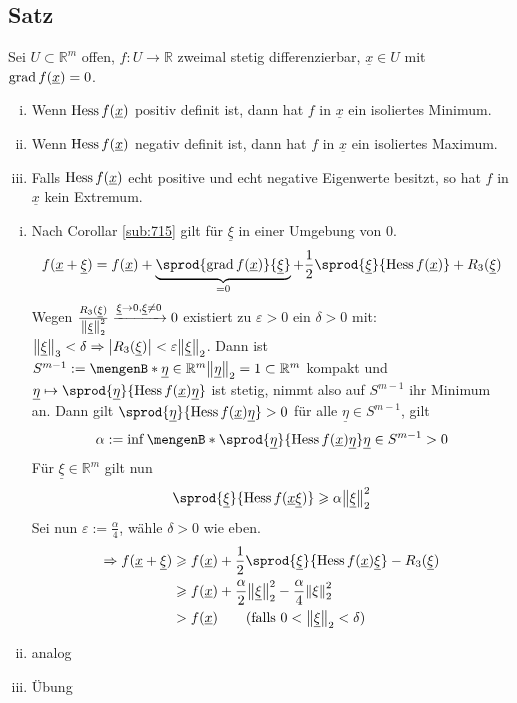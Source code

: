 \subsection[Satz über ein hinreichendes Kriterium für Extrema]{Satz} %
\label{sub:719}
Sei $U \subset \mathds{R}^m$ offen, $f : U \to \mathds{R}$ zweimal stetig differenzierbar, $\underline{x} \in U$ mit $\operatorname{grad} f(\underline{x}) =0$. 
\begin{enumerate}[(i)]
	\item Wenn $\operatorname{Hess} f(\underline{x})$ positiv definit ist, dann hat $f$ in $\underline{x}$ ein isoliertes Minimum.
	\item Wenn $\operatorname{Hess} f(\underline{x})$ negativ definit ist, dann hat $f$ in $\underline{x}$ ein isoliertes Maximum.
	\item Falls $\operatorname{Hess} f(\underline{x})$ echt positive und echt negative Eigenwerte besitzt, so hat $f$ in $\underline{x}$ kein Extremum.
\end{enumerate}
\begin{enumerate}[(i)]
	\item Nach Corollar \ref{sub:715} gilt für $\underline{\xi}$ in einer Umgebung von $0$.
	\begin{align*}
		f(\underline{x} + \underline{\xi}) = f(\underline{x}) + \underbrace{\sprod{\grad f(\underline{x})}{\underline{\xi}}}_{=0} + 
		\frac{1}{2} \sprod{\underline{\xi}}{ \hess f(\underline{x})} + R_3 (\underline{\xi})  
	\end{align*}
	Wegen $\frac{R_3 (\underline{\xi})}{\norm[2]{\underline{\xi}}^2 } \xrightarrow{\underline{\xi} \to 0, \underline{\xi} \not= 0}  0$ existiert zu $\varepsilon >0$ ein 
	$\delta >0$ mit: $\norm[3]{\underline{\xi}} < \delta   \Rightarrow  \abs*{R_3( \underline{\xi})} < \varepsilon \norm[2]{\underline{\xi}} $. Dann ist
	$S^{m-1} := \set[\underline{\eta} \in \mathds{R}^m]{\norm[2]{\underline{\eta}} =1 } \subset \mathds{R}^m$ kompakt und 
	$\underline{\eta} \mapsto \sprod{\underline{\eta}}{ \hess f (\underline{x}) \underline{\eta}} $ ist stetig, nimmt also auf $S^{m-1}$ ihr Minimum an. Dann gilt
	$\sprod{\underline{\eta}}{ \hess f(\underline{x}) \underline{\eta}} >0$ für alle $\underline{\eta} \in S^{m-1}$, gilt 
	\[
		\alpha := \inf \set[\sprod{\underline{\eta}}{\hess f(\underline{x}) \underline{\eta}} ]{\underline{\eta} \in S^{m-1}} >0 
	\]
	Für $\underline{\xi} \in \mathds{R}^m$ gilt nun
	\[
		\sprod{\underline{\xi}}{\hess f(\underline{x} \underline{\xi})} \ge \alpha \norm[2]{\underline{\xi}}^2  
	\]
	Sei nun $\varepsilon := \frac{\alpha}{4}$, wähle $\delta >0$ wie eben. 
	\begin{align*}
		\Rightarrow  f(\underline{x} + \underline{\xi}) &\ge f(\underline{x}) + \frac{1}{2} \sprod{\underline{\xi}}{\hess f(\underline{x}) \underline{\xi}}  - R_3 
		(\underline{\xi}) \\
		&\ge f(\underline{x}) + \frac{\alpha}{2} \norm[2]{\underline{\xi}}^2 - \frac{\alpha}{4} \norm[2]{\xi}^2 \\
		&> f(\underline{x}) \tag{falls $0< \norm[2]{\underline{\xi}}< \delta  $}
	\end{align*}
	\item analog
	\item Übung
\end{enumerate} \bewende
